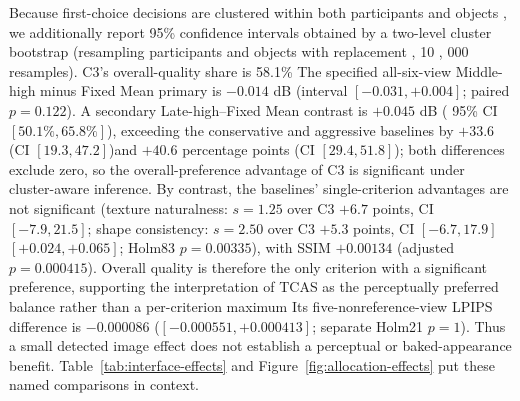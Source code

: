 \documentclass[times,twocolumn,final]{elsarticle}
\providecommand{\DIFadd}[1]{{\protect\color{blue} \sf #1}} %
\providecommand{\DIFdel}[1]{{\protect\color{red} \scriptsize #1}} %
\providecommand{\DIFaddbegin}{} %
\providecommand{\DIFaddend}{} %
\providecommand{\DIFdelbegin}{} %
\providecommand{\DIFdelend}{} %
\begin{document}
\DIFdelbegin \DIFdel{Because first-choice decisions are clustered within both participants and objects , we additionally report 95\% confidence intervals obtained by a two-level cluster bootstrap (resampling participants and objects with replacement , 10}%
\DIFdel{,}%
\DIFdel{000 resamples). C3's overall-quality share is 58.1\% }\DIFdelend \DIFaddbegin \DIFadd{The specified all-six-view Middle-high minus Fixed Mean primary is $-0.014$ dB (interval $[-0.031,+0.004]$; paired $p=0.122$). A secondary Late-high--Fixed Mean contrast is $+0.045$ dB }\DIFaddend (\DIFdelbegin \DIFdel{95\% CI $[50.1\%, 65.8\%]$), exceeding the conservative and aggressive baselines by $+33.6$ (CI $[19.3, 47.2]$)and $+40.6$ percentage points (CI $[29.4, 51.8]$); both differences exclude zero, so the overall-preference advantage of C3 is significant under cluster-aware inference. By contrast, the baselines' single-criterion advantages are not significant (texture naturalness: $s = 1.25$ over C3 $+6.7$ points, CI $[-7.9, 21.5]$; shape consistency: $s = 2.50$ over C3 $+5.3$ points, CI $[-6.7, 17.9]$}\DIFdelend \DIFaddbegin \DIFadd{$[+0.024,+0.065]$; Holm83 $p=0.00335$), with SSIM $+0.00134$ (adjusted $p=0.000415$}\DIFaddend ). \DIFdelbegin \DIFdel{Overall quality is therefore the only criterion with a significant preference, supporting the interpretation of TCAS as the perceptually preferred balance rather than a per-criterion maximum}\DIFdelend \DIFaddbegin \DIFadd{Its five-nonreference-view LPIPS difference is $-0.000086$ ($[-0.000551,+0.000413]$; separate Holm21 $p=1$). Thus a small detected image effect does not establish a perceptual or baked-appearance benefit. Table~\ref{tab:interface-effects} and Figure~\ref{fig:allocation-effects} put these named comparisons in context}\DIFaddend .
\end{document}
